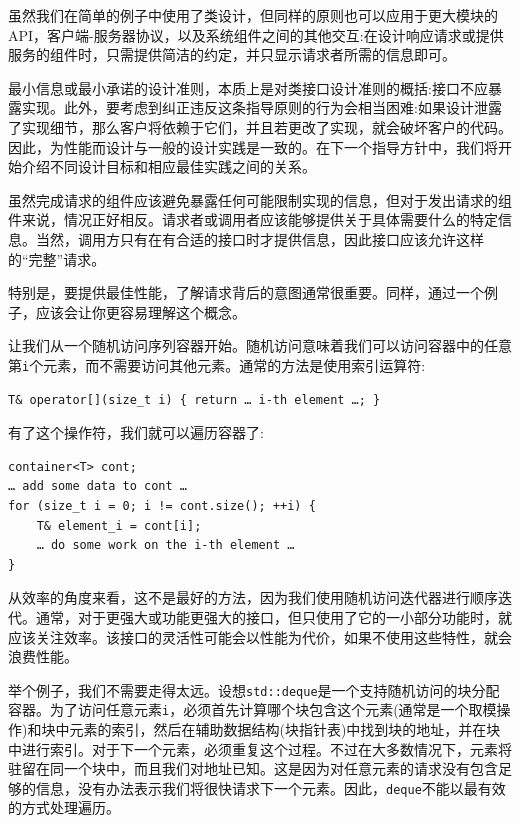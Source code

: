 虽然我们在简单的例子中使用了类设计，但同样的原则也可以应用于更大模块的API，客户端-服务器协议，以及系统组件之间的其他交互:在设计响应请求或提供服务的组件时，只需提供简洁的约定，并只显示请求者所需的信息即可。

最小信息或最小承诺的设计准则，本质上是对类接口设计准则的概括:接口不应暴露实现。此外，要考虑到纠正违反这条指导原则的行为会相当困难:如果设计泄露了实现细节，那么客户将依赖于它们，并且若更改了实现，就会破坏客户的代码。因此，为性能而设计与一般的设计实践是一致的。在下一个指导方针中，我们将开始介绍不同设计目标和相应最佳实践之间的关系。




虽然完成请求的组件应该避免暴露任何可能限制实现的信息，但对于发出请求的组件来说，情况正好相反。请求者或调用者应该能够提供关于具体需要什么的特定信息。当然，调用方只有在有合适的接口时才提供信息，因此接口应该允许这样的“完整”请求。

特别是，要提供最佳性能，了解请求背后的意图通常很重要。同样，通过一个例子，应该会让你更容易理解这个概念。
 
让我们从一个随机访问序列容器开始。随机访问意味着我们可以访问容器中的任意第\texttt{i}个元素，而不需要访问其他元素。通常的方法是使用索引运算符:

\begin{lstlisting}[style=styleCXX]
T& operator[](size_t i) { return … i-th element …; }
\end{lstlisting}

有了这个操作符，我们就可以遍历容器了:

\begin{lstlisting}[style=styleCXX]
container<T> cont;
… add some data to cont …
for (size_t i = 0; i != cont.size(); ++i) {
	T& element_i = cont[i];
	… do some work on the i-th element …
}
\end{lstlisting}

从效率的角度来看，这不是最好的方法，因为我们使用随机访问迭代器进行顺序迭代。通常，对于更强大或功能更强大的接口，但只使用了它的一小部分功能时，就应该关注效率。该接口的灵活性可能会以性能为代价，如果不使用这些特性，就会浪费性能。 

举个例子，我们不需要走得太远。设想\texttt{std::deque}是一个支持随机访问的块分配容器。为了访问任意元素\texttt{i}，必须首先计算哪个块包含这个元素(通常是一个取模操作)和块中元素的索引，然后在辅助数据结构(块指针表)中找到块的地址，并在块中进行索引。对于下一个元素，必须重复这个过程。不过在大多数情况下，元素将驻留在同一个块中，而且我们对地址已知。这是因为对任意元素的请求没有包含足够的信息，没有办法表示我们将很快请求下一个元素。因此，\texttt{deque}不能以最有效的方式处理遍历。


